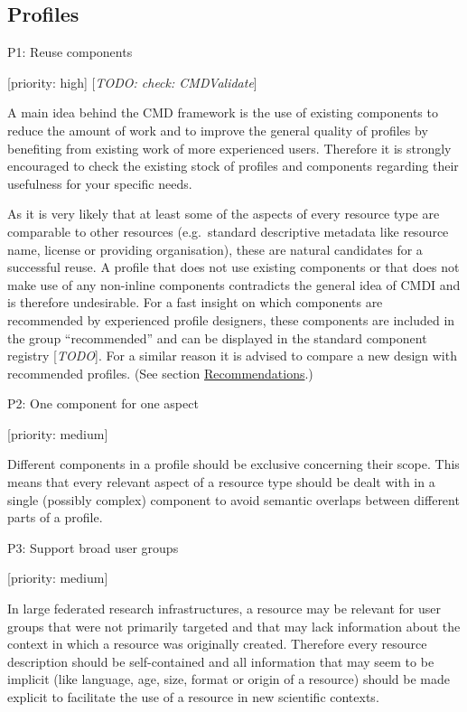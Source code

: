 \documentclass[]{article}
\date{}
\begin{document}
\subsection{Profiles}\label{profiles}

P1: Reuse components

{[}priority: high{]} {[}\emph{TODO: check: CMDValidate}{]}

A main idea behind the CMD framework is the use of existing components
to reduce the amount of work and to improve the general quality of
profiles by benefiting from existing work of more experienced users.
Therefore it is strongly encouraged to check the existing stock of
profiles and components regarding their usefulness for your specific
needs.

As it is very likely that at least some of the aspects of every resource
type are comparable to other resources (e.g.~standard descriptive
metadata like resource name, license or providing organisation), these
are natural candidates for a successful reuse. A profile that does not
use existing components or that does not make use of any non-inline
components contradicts the general idea of CMDI and is therefore
undesirable. For a fast insight on which components are recommended by
experienced profile designers, these components are included in the
group ``recommended'' and can be displayed in the standard component
registry {[}\emph{TODO}{]}. For a similar reason it is advised to
compare a new design with recommended profiles. (See section
\href{/recommendations/README.md}{Recommendations}.)

P2: One component for one aspect

{[}priority: medium{]}

Different components in a profile should be exclusive concerning their
scope. This means that every relevant aspect of a resource type should
be dealt with in a single (possibly complex) component to avoid semantic
overlaps between different parts of a profile.

P3: Support broad user groups

{[}priority: medium{]}

In large federated research infrastructures, a resource may be relevant
for user groups that were not primarily targeted and that may lack
information about the context in which a resource was originally
created. Therefore every resource description should be self-contained
and all information that may seem to be implicit (like language, age,
size, format or origin of a resource) should be made explicit to
facilitate the use of a resource in new scientific contexts.
\end{document}
